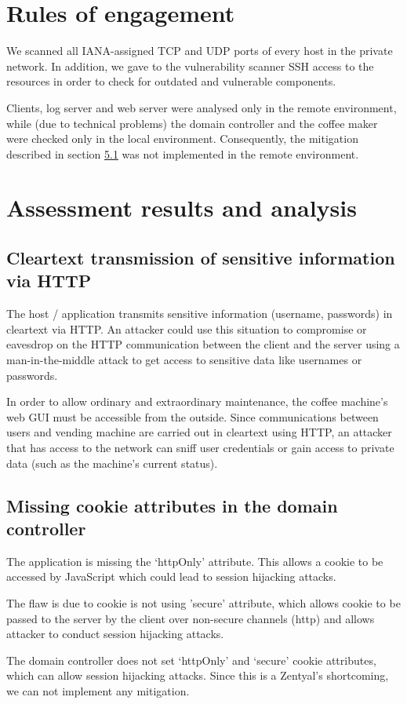 \documentclass[draft]{homework}
\begin{document}
    
    \section{Rules of engagement}
    We scanned all IANA-assigned TCP and UDP ports of every host in the private network.
    In addition, we gave to the vulnerability scanner SSH access to the resources in order to check for outdated and vulnerable components.
    
    Clients, log server and web server were analysed only in the remote environment, while (due to technical problems) the domain controller and the coffee maker were checked only in the local environment.
    Consequently, the mitigation described in section \hyperref[sec:http-mitigation]{5.1} was not implemented in the remote environment.
    
    
    \section{Assessment results and analysis}
    \subsection{Cleartext transmission of sensitive information via HTTP}
    \begin{displayquote}
        The host / application transmits sensitive information (username, passwords) in cleartext via HTTP.
        \textelp{}
        An attacker could use this situation to compromise or eavesdrop on the HTTP communication between the client and the server using a man-in-the-middle attack to get access to sensitive data like usernames or passwords.
    \end{displayquote}
    In order to allow ordinary and extraordinary maintenance, the coffee machine's web GUI must be accessible from the outside.
    Since communications between users and vending machine are carried out in cleartext using HTTP, an attacker that has access to the network can sniff user credentials or gain access to private data (such as the machine's current status).
    
    \subsection{Missing cookie attributes in the domain controller}
    \begin{displayquote}
        The application is missing the `httpOnly' attribute.
        \textelp{}
        This allows a cookie to be accessed by JavaScript which could lead to session hijacking attacks.
    \end{displayquote}
    \begin{displayquote}
        The flaw is due to cookie is not using 'secure' attribute, which allows cookie to be passed to the server by the client over non-secure channels (http) and allows attacker to conduct session hijacking attacks.
    \end{displayquote}
    The domain controller does not set `httpOnly' and `secure' cookie attributes, which can allow session hijacking attacks.
    Since this is a Zentyal's shortcoming, we can not implement any mitigation.
    
\end{document}
